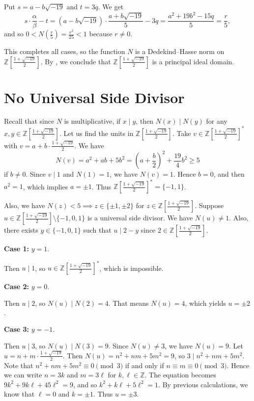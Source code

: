 \documentclass[a4paper,12pt]{report}
\begin{document}
Put $s=a-b\sqrt{-19}$ and $t=3q$. We get
\[
    s\cdot\frac{\alpha}{\beta}-t=(a-b\sqrt{-19})\cdot\frac{a+b\sqrt{-19}}{5}-3q=\frac{a^2+19b^2-15q}{5}=\frac{r}{5},
\]
and so $0<N\left(\frac{r}{5}\right)=\frac{r^2}{25}<1$ because $r\neq 0$. 

This completes all cases, so the function $N$ is a Dedekind--Hasse norm on $\mathbb{Z}\left[\frac{1+\sqrt{-19}}{2}\right]$. By , we conclude that $\mathbb{Z}\left[\frac{1+\sqrt{-19}}{2}\right]$ is a principal ideal domain.

\section*{No Universal Side Divisor}

Recall that since $N$ is multiplicative, if $x\mid y$, then $N(x)\mid N(y)$ for any $x,y\in \mathbb{Z}\left[\frac{1+\sqrt{-19}}{2}\right]$. Let us find the units in $\mathbb{Z}\left[\frac{1+\sqrt{-19}}{2}\right]$. Take $v\in \mathbb{Z}\left[\frac{1+\sqrt{-19}}{2}\right]^*$ with $v=a+b\cdot\frac{1+\sqrt{-19}}{2}$. We have 
\[
N(v)=a^2+ab+5b^2=\left(a+\frac{b}{2}\right)^2+\frac{19}{4}b^2\ge5
\]
if $b\neq 0$. Since $v\mid1$ and $N(1)=1$, we have $N(v)=1$. Hence $b=0$, and then $a^2=1$, which implies $a=\pm1$. Thus $\mathbb{Z}\left[\frac{1+\sqrt{-19}}{2}\right]^*=\{-1,1\}$. 

Also, we have $N(z)<5 \implies z\in\{\pm1,\pm2\}$ for $z\in \mathbb{Z}\left[\frac{1+\sqrt{-19}}{2}\right]$. Suppose $u\in \mathbb{Z}\left[\frac{1+\sqrt{-19}}{2}\right]\setminus\{-1,0,1\}$ is a universal side divisor. We have $N(u)\neq 1$. Also, there exists $y\in\{-1,0,1\}$ such that $u\mid 2-y$ since $2\in \mathbb{Z}\left[\frac{1+\sqrt{-19}}{2}\right]$.

\medskip
\noindent\textbf{Case 1:} $y=1$.

Then $u\mid 1$, so $u\in \mathbb{Z}\left[\frac{1+\sqrt{-19}}{2}\right]^*$, which is impossible.

\medskip
\noindent\textbf{Case 2:} $y=0$.

Then $u\mid 2$, so $N(u)\mid N(2)=4$. That means $N(u)=4$, which yields $u=\pm2$.

\medskip
\noindent\textbf{Case 3:} $y=-1$.

Then $u\mid 3$, so $N(u)\mid N(3)=9$. Since $N(u)\neq 3$, we have $N(u)=9$. Let $u=n+m\cdot \frac{1+\sqrt{-19}}{2}$. Then $N(u)=n^2+nm+5m^2=9$, so $3\mid n^2+nm+5m^2$. Note that $n^2+nm+5m^2\equiv 0\pmod{3}$ if and only if $n\equiv m\equiv 0\pmod{3}$. Hence we can write $n=3k$ and $m=3\ell$ for $k,\ell\in\mathbb{Z}$. The equation becomes $9k^2+9k\ell+45\ell^2=9$, and so $k^2+k\ell+5\ell^2=1$. By previous calculations, we know that $\ell=0$ and $k=\pm1$. Thus $u=\pm 3$. 
\end{document}
